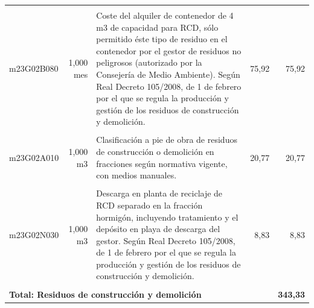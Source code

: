\documentclass{book}%
\begin{document}
\begin{longtable}{lrlrr}
&&&&\\%
m23G02B080&     1,000 mes&\multicolumn{1}{p{5cm}}{Coste del alquiler de contenedor de 4 m3 de capacidad para RCD, sólo permitido éste tipo de residuo en el contenedor por el gestor de residuos no peligrosos (autorizado por la Consejería de Medio Ambiente). Según Real Decreto 105/2008, de 1 de febrero por el que se regula la producción y gestión de los residuos de construcción y demolición.}&     75,92&75,92\\%
&&&&\\%
m23G02A010&     1,000 m3&\multicolumn{1}{p{5cm}}{Clasificación a pie de obra de residuos de construcción o demolición en fracciones según normativa vigente, con medios manuales.}&     20,77&20,77\\%
&&&&\\%
m23G02N030&     1,000 m3&\multicolumn{1}{p{5cm}}{Descarga en planta de reciclaje de RCD separado en la fracción hormigón, incluyendo tratamiento y el depósito en playa de descarga del gestor. Según Real Decreto 105/2008, de 1 de febrero por el que se regula la producción y gestión de los residuos de construcción y demolición.}&      8,83&8,83\\%
&&&&\\%
\multicolumn{4}{p{8cm}}{\textbf{Total: Residuos de construcción y demolición}}&\textbf{343,33}\\%
\end{longtable}%
\normalsize

%
\end{document}
